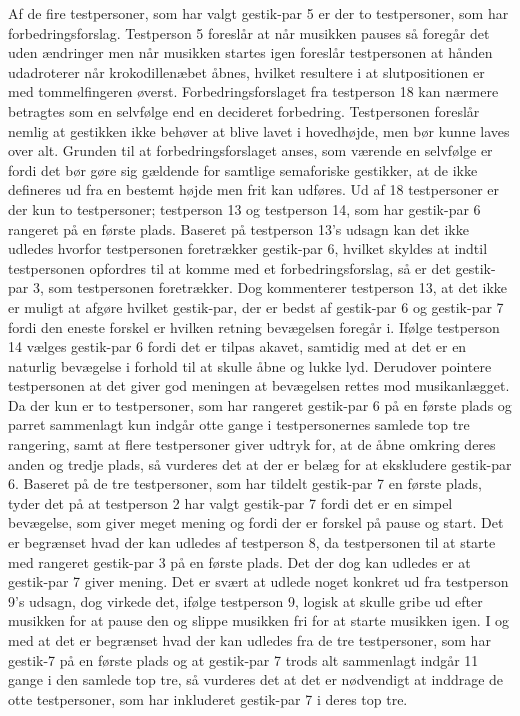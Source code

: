 Af de fire testpersoner, som har valgt gestik-par 5 er der to testpersoner, som har forbedringsforslag. Testperson 5 foreslår at når musikken pauses så foregår det uden ændringer men når musikken startes igen foreslår testpersonen at hånden udadroterer når krokodillenæbet åbnes, hvilket resultere i at slutpositionen er med tommelfingeren øverst. Forbedringsforslaget fra testperson 18 kan nærmere betragtes som en selvfølge end en decideret forbedring. Testpersonen foreslår nemlig at gestikken ikke behøver at blive lavet i hovedhøjde, men bør kunne laves over alt. Grunden til at forbedringsforslaget anses, som værende en selvfølge er fordi det bør gøre sig gældende for samtlige semaforiske gestikker, at de ikke defineres ud fra en bestemt højde men frit kan udføres.\blankline
% 
Ud af 18 testpersoner er der kun to testpersoner; testperson 13 og testperson 14, som har gestik-par 6 rangeret på en første plads. Baseret på testperson 13's udsagn kan det ikke udledes hvorfor testpersonen foretrækker gestik-par 6, hvilket skyldes at indtil testpersonen opfordres til at komme med et forbedringsforslag, så er det gestik-par 3, som testpersonen foretrækker. Dog kommenterer testperson 13, at det ikke er muligt at afgøre hvilket gestik-par, der er bedst af gestik-par 6 og gestik-par 7 fordi den eneste forskel er hvilken retning bevægelsen foregår i. Ifølge testperson 14 vælges gestik-par 6 fordi det er tilpas akavet, samtidig med at det er en naturlig bevægelse i forhold til at skulle åbne og lukke lyd. Derudover pointere testpersonen at det giver god meningen at bevægelsen rettes mod musikanlægget. Da der kun er to testpersoner, som har rangeret gestik-par 6 på en første plads og parret sammenlagt kun indgår otte gange i testpersonernes samlede top tre rangering, samt at flere testpersoner giver udtryk for, at de åbne omkring deres anden og tredje plads, så vurderes det at der er belæg for at ekskludere gestik-par 6. \blankline
%   
Baseret på de tre testpersoner, som har tildelt gestik-par 7 en første plads, tyder det på at testperson 2 har valgt gestik-par 7 fordi det er en simpel bevægelse, som giver meget mening og fordi der er forskel på pause og start. Det er begrænset hvad der kan udledes af testperson 8, da testpersonen til at starte med rangeret gestik-par 3 på en første plads. Det der dog kan udledes er at gestik-par 7 giver mening. Det er svært at udlede noget konkret ud fra testperson 9's udsagn, dog virkede det, ifølge testperson 9, logisk at skulle gribe ud efter musikken for at pause den og slippe musikken fri for at starte musikken igen. I og med at det er begrænset hvad der kan udledes fra de tre testpersoner, som har gestik-7 på en første plads og at gestik-par 7 trods alt sammenlagt indgår 11 gange i den samlede top tre, så vurderes det at det er nødvendigt at inddrage de otte testpersoner, som har inkluderet gestik-par 7 i deres top tre. 

